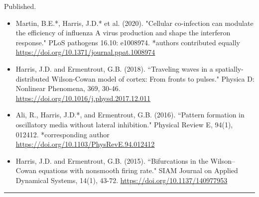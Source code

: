 \documentclass[a4paper,10pt]{article}
\newlength{\cvcolumngapwidth}
\newlength{\cvleftcolumnwidth}
\newlength{\cvrightcolumnwidth}
\newcommand{\cvsectionstyle}[1]{{\normalsize\cvsectionfont\textcolor{cvsectioncolor}{#1}}}
\newcommand{\cvtitlestyle}[1]{{\large\cvtitlefont\textcolor{cvtitlecolor}{#1}}}
\newcommand{\cvdurationstyle}[1]{{\small\cvdurationfont\textcolor{cvdurationcolor}{#1}}}
\newlength{\cvafteritemskipamount}
\newlength{\cvaftersectionskipamount}
\newlength{\cvbetweensectionandheadingextraskipamount}
\newlength{\cvaftertitleskipamount}
\newlength{\cvparskip}
\newcommand{\cvsection}[1]{
            \begin{minipage}[t]{\cvleftcolumnwidth}
                \raggedleft\cvsectionstyle{#1}
            \end{minipage}%
            \hspace{\cvcolumngapwidth}%
            \begin{minipage}[t]{\cvrightcolumnwidth}
                \textcolor{cvrulecolor}{\rule{\cvrightcolumnwidth}{0.3mm}}
            \end{minipage}
        
            \vspace{\cvaftersectionskipamount}
        }
\newcommand{\cvitem}[2]{
            \begin{minipage}[t]{\cvleftcolumnwidth}
                \raggedleft #1
            \end{minipage}%
            \hspace{\cvcolumngapwidth}%
            \begin{minipage}[t]{\cvrightcolumnwidth}
                \setlength{\parskip}{\cvparskip} #2
            \end{minipage}
        
            \vspace{\cvafteritemskipamount}
        }
\newcommand{\cvtitle}[1]{
            \cvtitlestyle{#1}
        
            \vspace{\cvaftertitleskipamount}
            \vspace{-\cvparskip}
        }
\begin{document}
        
        \cvitem{
            \cvdurationstyle{Published.}
        }{
            \begin{itemize}[leftmargin=*]
                	\item Martin, B.E.*, Harris, J.D.* et al. (2020). "Cellular co-infection can modulate the efficiency of influenza A virus production and shape the interferon response." PLoS pathogens 16.10: e1008974. *authors contributed equally \href{https://doi.org/10.1371/journal.ppat.1008974}{\underline{https://doi.org/10.1371/journal.ppat.1008974}}
        	        \item  Harris, J.D. and Ermentrout, G.B. (2018). ``Traveling waves in a spatially-distributed Wilson-Cowan model of cortex: From fronts to pulses." Physica D: Nonlinear Phenomena, 369, 30-46. \href{https://doi.org/10.1016/j.physd.2017.12.011}{\underline{https://doi.org/10.1016/j.physd.2017.12.011}}
            \end{itemize}
        }    	
        \cvitem{
            \cvdurationstyle{}
        }{	
        	\newpage
        \begin{itemize}[leftmargin=*]	
                \item Ali, R., Harris, J.D.*, and Ermentrout, G.B. (2016). ``Pattern formation in oscillatory media without lateral inhibition." Physical Review E, 94(1), 012412. *corresponding author \\ \href{https://doi.org/10.1103/PhysRevE.94.012412}{\underline{https://doi.org/10.1103/PhysRevE.94.012412}}
                \item Harris, J.D. and Ermentrout, G.B. (2015). ``Bifurcations in the Wilson--Cowan equations with nonsmooth firing rate." SIAM Journal on Applied Dynamical Systems, 14(1), 43-72. \href{https://doi.org/10.1137/140977953}{\underline{https://doi.org/10.1137/140977953}}
            \end{itemize}
        
        }
        
        
        \cvsection{PRESENTATIONS}
        \vspace{\cvbetweensectionandheadingextraskipamount}
        
\end{document}
